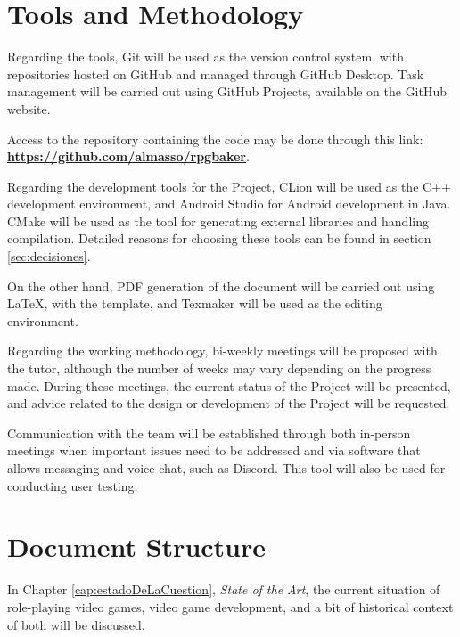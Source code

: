 \section*{Tools and Methodology}
Regarding the tools, Git will be used as the version control system, with repositories hosted on GitHub and managed through GitHub Desktop. Task management will be carried out using GitHub Projects, available on the GitHub website.

\smallskip

Access to the repository containing the code may be done through this link: \href{https://github.com/almasso/rpgbaker}{\textbf{https://github.com/almasso/rpgbaker}}.

\medskip

Regarding the development tools for the Project, CLion will be used as the C++ development environment, and Android Studio for Android development in Java. CMake will be used as the tool for generating external libraries and handling compilation. Detailed reasons for choosing these tools can be found in section \ref{sec:decisiones}.

\medskip

On the other hand, PDF generation of the document will be carried out using \LaTeX, with the \texis template, and Texmaker will be used as the editing environment.

\bigskip

Regarding the working methodology, bi-weekly meetings will be proposed with the tutor, although the number of weeks may vary depending on the progress made. During these meetings, the current status of the Project will be presented, and advice related to the design or development of the Project will be requested.

\medskip

Communication with the team will be established through both in-person meetings when important issues need to be addressed and via software that allows messaging and voice chat, such as Discord. This tool will also be used for conducting user testing.

\section*{Document Structure} 
In Chapter \ref{cap:estadoDeLaCuestion}, \textit{State of the Art}, the current situation of role-playing video games, video game development, and a bit of historical context of both will be discussed.

\medskip

